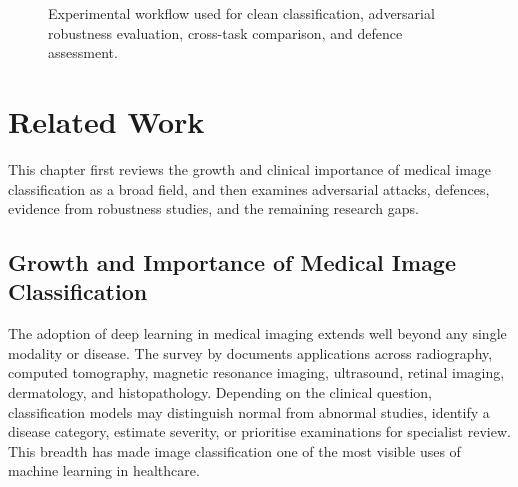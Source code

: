 \documentclass[12pt,a4paper,oneside]{report}
\begin{document}
\begin{figure}[htbp]
  \caption{Experimental workflow used for clean classification, adversarial robustness evaluation, cross-task comparison, and defence assessment.}
  \label{fig:experimental-workflow}
\end{figure}

\chapter{Related Work}
\label{ch:related}


This chapter first reviews the growth and clinical importance of medical image classification as a broad field, and then examines adversarial attacks, defences, evidence from robustness studies, and the remaining research gaps.

\section{Growth and Importance of Medical Image Classification}


The adoption of deep learning in medical imaging extends well beyond any single modality or disease. The survey by \citet{litjens2017survey} documents applications across radiography, computed tomography, magnetic resonance imaging, ultrasound, retinal imaging, dermatology, and histopathology. Depending on the clinical question, classification models may distinguish normal from abnormal studies, identify a disease category, estimate severity, or prioritise examinations for specialist review. This breadth has made image classification one of the most visible uses of machine learning in healthcare.
\end{document}
